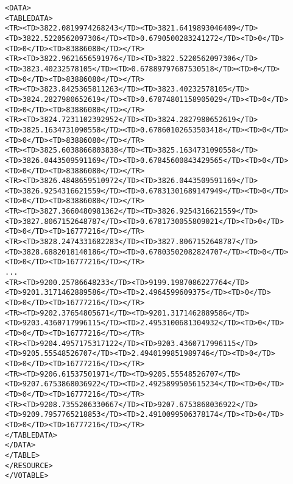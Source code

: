 \begin{landscape}
{\begin{flushleft}
\begin{fmlpage}
\begin{verbatim}
<DATA>
<TABLEDATA>
<TR><TD>3822.0819974268243</TD><TD>3821.6419893046409</TD><TD>3822.5220562097306</TD><TD>0.6790500283241272</TD><TD>0</TD><TD>0</TD><TD>83886080</TD></TR>
<TR><TD>3822.9621656591976</TD><TD>3822.5220562097306</TD><TD>3823.40232578105</TD><TD>0.67889797687530518</TD><TD>0</TD><TD>0</TD><TD>83886080</TD></TR>
<TR><TD>3823.8425365811263</TD><TD>3823.40232578105</TD><TD>3824.2827980652619</TD><TD>0.67874801158905029</TD><TD>0</TD><TD>0</TD><TD>83886080</TD></TR>
<TR><TD>3824.7231102392952</TD><TD>3824.2827980652619</TD><TD>3825.1634731090558</TD><TD>0.67860102653503418</TD><TD>0</TD><TD>0</TD><TD>83886080</TD></TR>
<TR><TD>3825.6038866803838</TD><TD>3825.1634731090558</TD><TD>3826.0443509591169</TD><TD>0.67845600843429565</TD><TD>0</TD><TD>0</TD><TD>83886080</TD></TR>
<TR><TD>3826.4848659510972</TD><TD>3826.0443509591169</TD><TD>3826.9254316621559</TD><TD>0.67831301689147949</TD><TD>0</TD><TD>0</TD><TD>83886080</TD></TR>
<TR><TD>3827.3660480981362</TD><TD>3826.9254316621559</TD><TD>3827.8067152648787</TD><TD>0.6781730055809021</TD><TD>0</TD><TD>0</TD><TD>16777216</TD></TR>
<TR><TD>3828.2474331682283</TD><TD>3827.8067152648787</TD><TD>3828.6882018140186</TD><TD>0.67803502082824707</TD><TD>0</TD><TD>0</TD><TD>16777216</TD></TR>
...
<TR><TD>9200.25786648233</TD><TD>9199.1987086227764</TD><TD>9201.3171462889586</TD><TD>2.4964599609375</TD><TD>0</TD><TD>0</TD><TD>16777216</TD></TR>
<TR><TD>9202.37654805671</TD><TD>9201.3171462889586</TD><TD>9203.4360717996115</TD><TD>2.4953100681304932</TD><TD>0</TD><TD>0</TD><TD>16777216</TD></TR>
<TR><TD>9204.4957175317122</TD><TD>9203.4360717996115</TD><TD>9205.55548526707</TD><TD>2.4940199851989746</TD><TD>0</TD><TD>0</TD><TD>16777216</TD></TR>
<TR><TD>9206.61537501971</TD><TD>9205.55548526707</TD><TD>9207.6753868036922</TD><TD>2.4925899505615234</TD><TD>0</TD><TD>0</TD><TD>16777216</TD></TR>
<TR><TD>9208.7355206330667</TD><TD>9207.6753868036922</TD><TD>9209.7957765218853</TD><TD>2.4910099506378174</TD><TD>0</TD><TD>0</TD><TD>16777216</TD></TR>
</TABLEDATA>
</DATA>
</TABLE>
</RESOURCE>
</VOTABLE>
\end{verbatim}
\end{fmlpage}
\end{flushleft}
}
\end{landscape}

